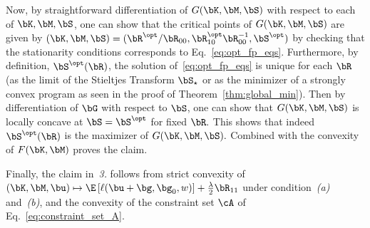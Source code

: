 Now, by straightforward differentiation of $G(\bK,\bM,\bS)$ with respect to each of $\bK,\bM,\bS$, one can show that the critical points of $G(\bK,\bM,\bS)$ are given by $(\bK,\bM, \bS) = (\bR^\opt/\bR_{00},\bR_{10}^\opt \bR_{00}^{-1},\bS^\opt)$ by checking that the stationarity conditions corresponds to Eq.~\eqref{eq:opt_fp_eqs}.
Furthermore, by definition, $\bS^\opt(\bR)$, the solution of~\eqref{eq:opt_fp_eqs} is unique for each $\bR$ (as the limit of the Stieltjes Transform $\bS_\star$ or as the minimizer of a strongly convex program as seen in the proof of Theorem~\ref{thm:global_min}).
Then by differentiation of $\bG$ with respect to $\bS$, one can show that $G(\bK,\bM,\bS)$ is locally concave at $\bS = \bS^\opt$ for fixed $\bR.$ This shows that indeed $\bS^\opt(\bR)$ is the maximizer of $G(\bK,\bM,\bS).$
Combined with the convexity of $F(\bK,\bM)$ proves the claim.

Finally, the claim in~\textit{3.} follows from strict convexity of  
$(\bK,\bM,\bu) \mapsto \E\left[\ell(\bu+ \bg,\bg_0,w)
\right]
+
\frac{\lambda}{2}\bR_{11}$ 
under condition~\textit{(a)} and~\textit{(b)}, and the convexity of the constraint set $\cA$ of Eq.~\eqref{eq:constraint_set_A}.



